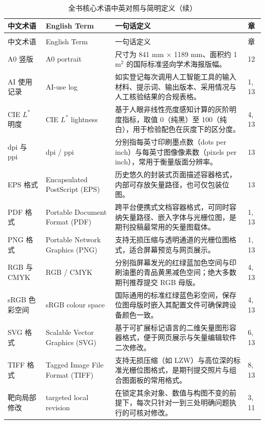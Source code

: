 \begingroup\small
\begin{longtable}{@{}p{26mm}p{32mm}p{54mm}p{8mm}@{}}
\caption{全书核心术语中英对照与简明定义（按拼音排序）}\label{tab:app-e-glossary}\\
\toprule
中文术语 & English Term & 一句话定义 & 章 \\
\midrule
\endfirsthead
\caption[]{全书核心术语中英对照与简明定义（续）}\\
\toprule
中文术语 & English Term & 一句话定义 & 章 \\
\midrule
\endhead
\bottomrule
\endfoot
A0 竖版 & A0 portrait & 尺寸为 841 mm $\times$ 1189 mm、面积约 1 m$^2$ 的国际标准竖向学术海报版幅。 & 12 \\
AI 使用记录 & AI-use log & 如实登记每次调用人工智能工具的输入材料、提示词、输出版本、采用情况与人工核验结果的合规表格。 & 1, 13 \\
CIE $L^*$ 明度 & CIE $L^*$ lightness & 基于人眼非线性亮度感知计算的灰阶明度指标，取值 0（纯黑）至 100（纯白），用于检验配色在灰度下的区分度。 & 4, 13 \\
dpi 与 ppi & dpi / ppi & 分别指每英寸印刷墨点数（dots per inch）与每英寸图像像素数（pixels per inch），常用于衡量版面分辨率。 & 13 \\
EPS 格式 & Encapsulated PostScript (EPS) & 历史悠久的封装式页面描述容器格式，内部可存放矢量路径，也可仅包装位图。 & 13 \\
PDF 格式 & Portable Document Format (PDF) & 跨平台便携式文档容器格式，可同时容纳矢量路径、嵌入字体与光栅位图，是期刊投稿最常用的矢量图载体。 & 1, 13 \\
PNG 格式 & Portable Network Graphics (PNG) & 支持无损压缩与透明通道的光栅位图格式，适合屏幕预览与网页展示。 & 1, 13 \\
RGB 与 CMYK & RGB / CMYK & 分别指屏幕发光的红绿蓝加色空间与印刷油墨的青品黄黑减色空间；绝大多数期刊推荐提交 RGB 母版。 & 4, 13 \\
sRGB 色彩空间 & sRGB colour space & 国际通用的标准红绿蓝色彩空间，保存位图母版时嵌入其配置文件可确保跨设备颜色一致。 & 4, 13 \\
SVG 格式 & Scalable Vector Graphics (SVG) & 基于可扩展标记语言的二维矢量图形容器格式，便于网页展示与矢量编辑软件二次修改。 & 6, 13 \\
TIFF 格式 & Tagged Image File Format (TIFF) & 支持无损压缩（如 LZW）与高位深的标准光栅位图格式，是期刊提交照片与组合图面板的常用格式。 & 8, 13 \\
靶向局部修改 & targeted local revision & 在锁定其余对象、数值与构图不变的前提下，每次只针对一到三处明确问题执行的可核对修改。 & 3, 11 \\

\end{longtable}
